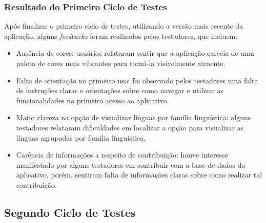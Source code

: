 \subsubsection{Resultado do Primeiro Ciclo de Testes}
\label{sec:Resultado do Primeiro Ciclo de Testes}
Após finalizar o primeiro ciclo de testes, utilizando a versão mais recente da aplicação, alguns \textit{feedbacks} foram realizados pelos testadores, que incluem:

\begin{itemize}
	\item Ausência de cores: usuários relataram sentir que a aplicação carecia de uma paleta de cores mais vibrantes para torná-la visivelmente atraente.
	\item Falta de orientação no primeiro uso: foi observado pelos testadores uma falta de instruções claras e orientações sobre como navegar e utilizar as funcionalidades no primeiro acesso ao aplicativo.
	\item Maior clareza na opção de visualizar línguas por família linguística: alguns testadores relataram dificuldades em localizar a opção para visualizar as línguas agrupadas por família linguística.
	\item Carência de informações a respeito de contribuição: houve interesse manifestado por alguns testadores em contribuir com a base de dados do aplicativo, porém, sentiram falta de informações claras sobre 
	como realizar tal contribuição. 
\end{itemize}

\subsection{Segundo Ciclo de Testes}
\label{sec:Segundo Ciclo}